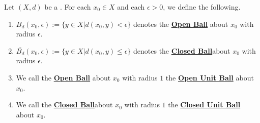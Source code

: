 \label{def:pseudometricball}
\newcommand{\OpenBall}[0]{ \textbf{\hyperref[def:pseudometricball]{Open Ball}} }
\newcommand{\OpenUnitBall}[0]{ \textbf{\hyperref[def:pseudometricball]{Open Unit Ball}} } 
\newcommand{\ClosedBall}[0]{ \textbf{\hyperref[def:pseudometricball]{Closed Ball}}}
\newcommand{\ClosedUnitBall}[0]{ \textbf{\hyperref[def:pseudometricball]{Closed  Unit Ball}} } 
\begin{df}
    Let $(X,d)$ be a \PseudometricSpace. 
    For each $x_0  \in X$ and each $\epsilon > 0$, we define the following.
    \begin{enumerate}
        \item  $B_d(x_0, \epsilon) := \{y \in X | d(x_0,y) < \epsilon\}$ denotes the \OpenBall about $x_0$ with radius $\epsilon$. 
    \item $\overline{B_d}(x_0,\epsilon) := \{y \in X | d(x_0,y) \leq \epsilon \}$ denotes the \ClosedBall about $x_0$ with radius $\epsilon$. 
    \item  We call the \OpenBall about $x_0$ with radius $1$ the \OpenUnitBall about $x_0$. 
    \item We call the \ClosedBall about $x_0$ with radius $1$ the \ClosedUnitBall about $x_0$. 
    \end{enumerate} 
    \end{df} 
